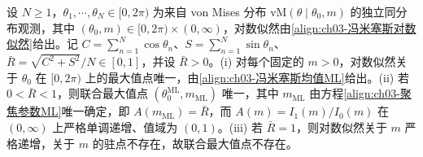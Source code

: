 \documentclass[../../main.tex]{subfiles}
\begin{document}
\begin{proposition}\label{proposition:ch03-冯米塞斯最大似然}
设 $N\geqslant1$，$\theta_1,\cdots,\theta_N\in[0,2\pi)$ 为来自 von Mises 分布 $\mathrm{vM}(\theta\mid\theta_0,m)$ 的独立同分布观测，其中 $(\theta_0,m)\in[0,2\pi)\times(0,\infty)$，对数似然由\eqref{align:ch03-冯米塞斯对数似然}给出。记 $C=\sum_{n=1}^{N}\cos\theta_n$、$S=\sum_{n=1}^{N}\sin\theta_n$、$\bar{R}=\sqrt{C^{2}+S^{2}}/N\in[0,1]$，并设 $\bar{R}>0$。(i) 对每个固定的 $m>0$，对数似然关于 $\theta_0$ 在 $[0,2\pi)$ 上的最大值点唯一，由\eqref{align:ch03-冯米塞斯均值ML}给出。(ii) 若 $0<\bar{R}<1$，则联合最大值点 $(\theta_0^{\mathrm{ML}},m_{\mathrm{ML}})$ 唯一，其中 $m_{\mathrm{ML}}$ 由方程\eqref{align:ch03-聚焦参数ML}唯一确定，即 $A(m_{\mathrm{ML}})=\bar{R}$，而 $A(m)=I_1(m)/I_0(m)$ 在 $(0,\infty)$ 上严格单调递增、值域为 $(0,1)$。(iii) 若 $\bar{R}=1$，则对数似然关于 $m$ 严格递增，关于 $m$ 的驻点不存在，故联合最大值点不存在。
\end{proposition}
\end{document}
